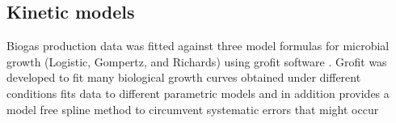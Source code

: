 \subsection{Kinetic models}
Biogas production data was fitted against three model formulas for microbial growth (Logistic, Gompertz, and Richards) using grofit software \cite{Kahm_2010}. Grofit was developed to fit many biological growth curves obtained under different conditions fits data to different parametric models and in
addition provides a model free spline method to circumvent systematic errors that might
occur